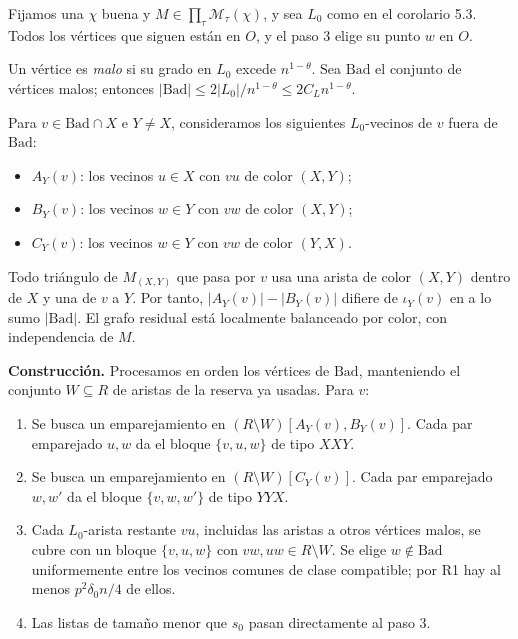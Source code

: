 \documentclass[spanish,11pt,a4paper]{article}
\providecommand{\tightlist}{\setlength{\itemsep}{0pt}\setlength{\parskip}{0pt}}
\begin{document}
Fijamos una \(\chi\) buena y \(M\in\prod_\tau\mathcal M_\tau(\chi)\), y sea \(L_0\) como en el corolario 5.3. Todos los vértices que siguen están en \(O\), y el paso 3 elige su punto \(w\) en \(O\).

Un vértice es \emph{malo} si su grado en \(L_0\) excede \(n^{1-\theta}\). Sea \(\mathrm{Bad}\) el conjunto de vértices malos; entonces \(|\mathrm{Bad}|\le2|L_0|/n^{1-\theta}\le2C_Ln^{1-\theta}\).

Para \(v\in\mathrm{Bad}\cap X\) e \(Y\ne X\), consideramos los siguientes \(L_0\)-vecinos de \(v\) fuera de \(\mathrm{Bad}\):

\begin{itemize}
\tightlist
\item
  \(A_Y(v)\): los vecinos \(u\in X\) con \(vu\) de color \((X,Y)\);
\item
  \(B_Y(v)\): los vecinos \(w\in Y\) con \(vw\) de color \((X,Y)\);
\item
  \(C_Y(v)\): los vecinos \(w\in Y\) con \(vw\) de color \((Y,X)\).
\end{itemize}

Todo triángulo de \(M_{(X,Y)}\) que pasa por \(v\) usa una arista de color \((X,Y)\) dentro de \(X\) y una de \(v\) a \(Y\). Por tanto, \(|A_Y(v)|-|B_Y(v)|\) difiere de \(\iota_Y(v)\) en a lo sumo \(|\mathrm{Bad}|\). El grafo residual está localmente balanceado por color, con independencia de \(M\).

\textbf{Construcción.} Procesamos en orden los vértices de \(\mathrm{Bad}\), manteniendo el conjunto \(W\subseteq R\) de aristas de la reserva ya usadas. Para \(v\):

\begin{enumerate}
\def\labelenumi{\arabic{enumi}.}
\tightlist
\item
  Se busca un emparejamiento en \((R\setminus W)[A_Y(v),B_Y(v)]\). Cada par emparejado \(u,w\) da el bloque \(\{v,u,w\}\) de tipo \(XXY\).
\item
  Se busca un emparejamiento en \((R\setminus W)[C_Y(v)]\). Cada par emparejado \(w,w'\) da el bloque \(\{v,w,w'\}\) de tipo \(YYX\).
\item
  Cada \(L_0\)-arista restante \(vu\), incluidas las aristas a otros vértices malos, se cubre con un bloque \(\{v,u,w\}\) con \(vw,uw\in R\setminus W\). Se elige \(w\notin\mathrm{Bad}\) uniformemente entre los vecinos comunes de clase compatible; por R1 hay al menos \(p^2\delta_0n/4\) de ellos.
\item
  Las listas de tamaño menor que \(s_0\) pasan directamente al paso 3.
\end{enumerate}
\end{document}
